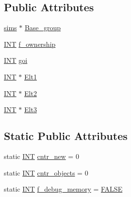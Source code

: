 \subsection*{Public Attributes}
\begin{DoxyCompactItemize}
\item 
\mbox{\hyperlink{classsims}{sims}} $\ast$ \mbox{\hyperlink{classaction__by__conjugation_a164a92341adcacb33cbd66124e6412c9}{Base\+\_\+group}}
\item 
\mbox{\hyperlink{galois_8h_a09fddde158a3a20bd2dcadb609de11dc}{I\+NT}} \mbox{\hyperlink{classaction__by__conjugation_aff09de68973f71b4509b82602b8ac000}{f\+\_\+ownership}}
\item 
\mbox{\hyperlink{galois_8h_a09fddde158a3a20bd2dcadb609de11dc}{I\+NT}} \mbox{\hyperlink{classaction__by__conjugation_a3a66103ee90655df494f64aa449e33a3}{goi}}
\item 
\mbox{\hyperlink{galois_8h_a09fddde158a3a20bd2dcadb609de11dc}{I\+NT}} $\ast$ \mbox{\hyperlink{classaction__by__conjugation_afb79b191c98097c58c25f4cf9611255d}{Elt1}}
\item 
\mbox{\hyperlink{galois_8h_a09fddde158a3a20bd2dcadb609de11dc}{I\+NT}} $\ast$ \mbox{\hyperlink{classaction__by__conjugation_a7f94b20980aaaab9849cba57d39ea783}{Elt2}}
\item 
\mbox{\hyperlink{galois_8h_a09fddde158a3a20bd2dcadb609de11dc}{I\+NT}} $\ast$ \mbox{\hyperlink{classaction__by__conjugation_aa0b6880f2972d3edb78867f33328b02d}{Elt3}}
\end{DoxyCompactItemize}
\subsection*{Static Public Attributes}
\begin{DoxyCompactItemize}
\item 
static \mbox{\hyperlink{galois_8h_a09fddde158a3a20bd2dcadb609de11dc}{I\+NT}} \mbox{\hyperlink{classaction__by__conjugation_a4fd5376ba60b371ef9ef7b6ae0fa8518}{cntr\+\_\+new}} = 0
\item 
static \mbox{\hyperlink{galois_8h_a09fddde158a3a20bd2dcadb609de11dc}{I\+NT}} \mbox{\hyperlink{classaction__by__conjugation_a02cd00e222d77ecd1d2131d829275551}{cntr\+\_\+objects}} = 0
\item 
static \mbox{\hyperlink{galois_8h_a09fddde158a3a20bd2dcadb609de11dc}{I\+NT}} \mbox{\hyperlink{classaction__by__conjugation_a91df661ec050b098f757d61406ddbfa2}{f\+\_\+debug\+\_\+memory}} = \mbox{\hyperlink{nauty_8h_aa93f0eb578d23995850d61f7d61c55c1}{F\+A\+L\+SE}}
\end{DoxyCompactItemize}


